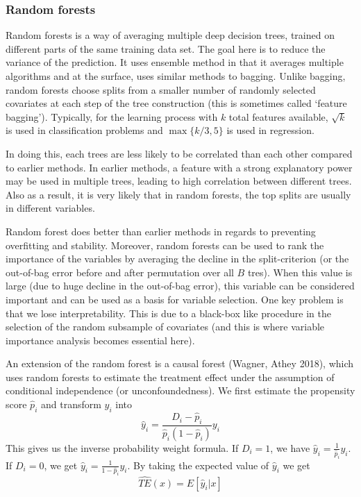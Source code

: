 \documentclass[12pt]{article}
\theoremstyle{definition}
\theoremstyle{property}
\theoremstyle{assumption}
\theoremstyle{example}
\theoremstyle{comment}
\begin{document}
\subsubsection{Random forests}
Random forests is a way of averaging multiple deep decision trees, trained on different parts of the same training data set. The goal here is to reduce the variance of the prediction. It uses ensemble method in that it averages multiple algorithms and at the surface, uses similar methods to bagging. Unlike bagging, random forests choose splits from a smaller number of randomly selected covariates at each step of the tree construction (this is sometimes called `feature bagging'). Typically, for the learning process with $k$ total features available, $\sqrt{k}$ is used in classification problems and $\max\{k/3,5\}$ is used in regression.
\par
 In doing this, each trees are less likely to be correlated than each other compared to earlier methods. In earlier methods, a feature with a strong explanatory power may be used in multiple trees, leading to high correlation between different trees. Also as a result, it is very likely that in random forests, the top splits are usually in different variables. 
 \par
Random forest does better than earlier methods in regards to preventing overfitting and stability. Moreover, random forests can be used to rank the importance of the variables by averaging the decline in the split-criterion (or the out-of-bag error before and after permutation over all $B$ tres). When this value is large (due to huge decline in the out-of-bag error), this variable can be considered important and can be used as a basis for variable selection. One key problem is that we lose interpretability. This is due to a black-box like procedure in the selection of the random subsample of covariates (and this is where variable importance analysis becomes essential here).  \par
An extension of the random forest is a causal forest (Wagner, Athey 2018), which uses random forests to estimate the treatment effect under the assumption of conditional independence (or unconfoundedness). We first estimate the propensity score $\hat{p}_i$ and transform $y_i$ into
\[
\hat{y}_i = \frac{D_i-\hat{p}_i}{\hat{p}_i(1-\hat{p}_i)}y_i
\]
This gives us the inverse probability weight formula. If $D_i=1$, we have $\hat{y}_i=\frac{1}{\hat{p}_i}y_i$. If $D_i=0$, we get $\hat{y}_i=\frac{1}{1-\hat{p}_i}y_i$. By taking the expected value of $\hat{y}_i$ we get
\[
\widehat{TE}(x)=E[\hat{y}_i|x]
\]
\end{document}

